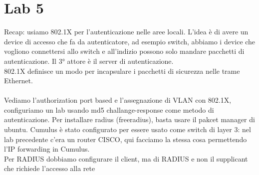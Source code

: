 \documentclass[12pt, oneside]{extbook} %
\begin{document}
\section*{Lab 5}
Recap: usiamo 802.1X per l'autenticazione nelle aree locali. L'idea è di avere un device di accesso che fa da autenticatore, ad esempio switch, abbiamo i device che vogliono connettersi allo switch e all'indizio possono solo mandare pacchetti di autenticazione. Il 3° attore è il server di autenticazione.\\ 802.1X definisce un modo per incapsulare i pacchetti di sicurezza nelle trame Ethernet.\\\\ Vediamo l'authorization port based e l'assegnazione di VLAN con 802.1X, configuriamo un lab usando md5 challange-response come metodo di autenticazione. Per installare radius (freeradius), basta usare il pakcet manager di ubuntu. Cumulus è stato configurato per essere usato come switch di layer 3: nel lab precedente c'era un router CISCO, qui facciamo la stessa cosa permettendo l'IP forwarding in Cumulus.\\ Per RADIUS dobbiamo configurare il client, ma di RADIUS e non il supplicant che richiede l'accesso alla rete
\end{document}
